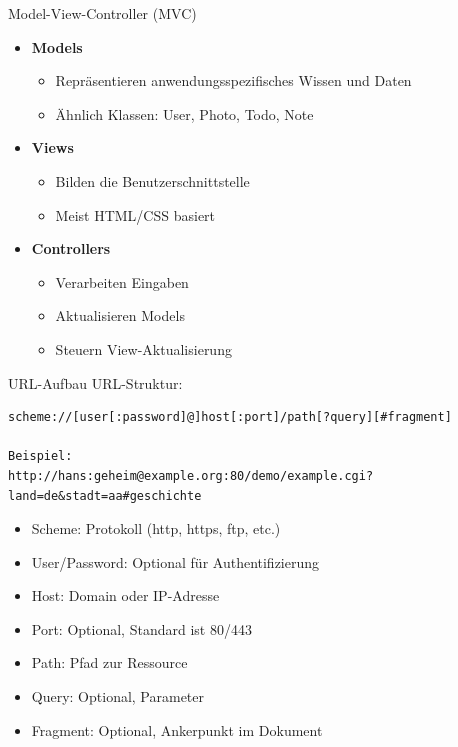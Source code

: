 \begin{concept}{Model-View-Controller (MVC)}
    \begin{itemize}
        \item \textbf{Models}
            \begin{itemize}
                \item Repräsentieren anwendungsspezifisches Wissen und Daten
                \item Ähnlich Klassen: User, Photo, Todo, Note
            \end{itemize}
        \item \textbf{Views}
            \begin{itemize}
                \item Bilden die Benutzerschnittstelle
                \item Meist HTML/CSS basiert
            \end{itemize}
        \item \textbf{Controllers}
            \begin{itemize}
                \item Verarbeiten Eingaben
                \item Aktualisieren Models
                \item Steuern View-Aktualisierung
            \end{itemize}
    \end{itemize}
\end{concept}

\begin{KR}{URL-Aufbau}
    URL-Struktur: %
    \begin{lstlisting}[style=basesmol]
scheme://[user[:password]@]host[:port]/path[?query][#fragment]

Beispiel:
http://hans:geheim@example.org:80/demo/example.cgi?land=de&stadt=aa#geschichte
    \end{lstlisting}

    \begin{itemize}
        \item Scheme: Protokoll (http, https, ftp, etc.)
        \item User/Password: Optional für Authentifizierung
        \item Host: Domain oder IP-Adresse
        \item Port: Optional, Standard ist 80/443
        \item Path: Pfad zur Ressource
        \item Query: Optional, Parameter
        \item Fragment: Optional, Ankerpunkt im Dokument
    \end{itemize}
\end{KR}